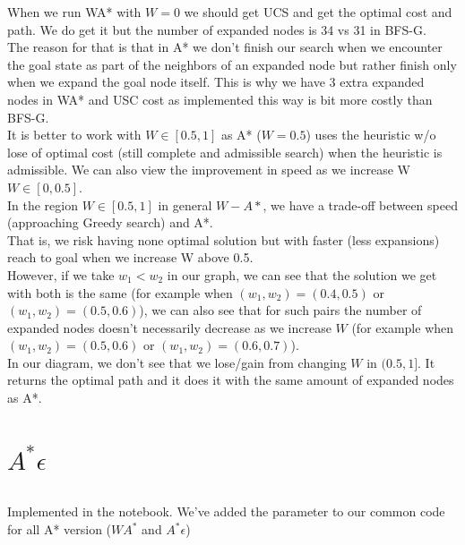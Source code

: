 \documentclass[12pt]{article}
\begin{document}
When we run WA* with $W=0$ we should get UCS and get the optimal cost and path. We do get it but the number of expanded nodes is 34 vs 31 in BFS-G.\\

The reason for that is that in A* we don't finish our search when we encounter the goal state as part of the neighbors of an expanded node but rather finish only when we expand the goal node itself. This is why we have 3 extra expanded nodes in WA* and USC cost as implemented this way is bit more costly than BFS-G.\\

It is better to work with $W\in[0.5,1]$ as A* ($W=0.5$) uses the heuristic w/o lose of optimal cost (still complete and admissible search) when the heuristic is admissible. We can also view the improvement in speed as we increase W $W\in[0,0.5]$.\\

In the region $W\in[0.5,1]$ in general $W-A*$, we have a trade-off between speed (approaching Greedy search) and A*.\\ That is, we risk having none optimal solution but with faster (less expansions) reach to goal when we increase W above 0.5.\\

However, if we take $w_1<w_2$ in our graph, we can see that the solution we get with both is the same (for example when $(w_1,w_2)=(0.4,0.5)$ or $(w_1,w_2)=(0.5,0.6)$), we can also see that for such pairs the number of expanded nodes doesn't necessarily decrease as we increase $W$ (for example when $(w_1,w_2)=(0.5,0.6)$ or $(w_1,w_2)=(0.6,0.7)$).\\

In our diagram, we don't see that we lose/gain from changing $W$ in $(0.5,1]$. It returns the optimal path and it does it with the same amount of expanded nodes as A*.

\section{$A^*\epsilon$}

\subsection{}

Implemented in the notebook. We've added the parameter to our common code for all A* version ($WA^*$ and $A^*\epsilon$)

\subsection{}
\end{document}
